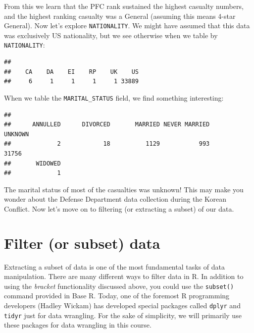 \documentclass[]{book}
\newenvironment{Shaded}{\begin{snugshade}}{\end{snugshade}}
\newcommand{\KeywordTok}[1]{\textcolor[rgb]{0.13,0.29,0.53}{\textbf{{#1}}}}
\newcommand{\NormalTok}[1]{{#1}}
\begin{document}
From this we learn that the PFC rank sustained the highest casualty
numbers, and the highest ranking casualty was a General (assuming this
means 4-star General). Now let's explore \texttt{NATIONALITY}. We might
have assumed that this data was exclusively US nationality, but we see
otherwise when we table by \texttt{NATIONALITY}:

\begin{Shaded}
\end{Shaded}

\begin{verbatim}
## 
##    CA    DA    EI    RP    UK    US 
##     6     1     1     1     1 33889
\end{verbatim}

When we table the \texttt{MARITAL\_STATUS} field, we find something
interesting:

\begin{Shaded}
\end{Shaded}

\begin{verbatim}
## 
##      ANNULLED      DIVORCED       MARRIED NEVER MARRIED       UNKNOWN 
##             2            18          1129           993         31756 
##       WIDOWED 
##             1
\end{verbatim}

The marital status of most of the casualties was unknown! This may make
you wonder about the Defense Department data collection during the
Korean Conflict. Now let's move on to filtering (or extracting a subset)
of our data.

\section{Filter (or subset) data}\label{filter-or-subset-data}

Extracting a subset of data is one of the most fundamental tasks of data
manipulation. There are many different ways to filter data in R. In
addition to using the \emph{bracket} functionality discussed above, you
could use the \texttt{subset()} command provided in Base R. Today, one
of the foremost R programming developers (Hadley Wickam) has developed
special packages called \texttt{dplyr} \citep{R-dplyr} and
\texttt{tidyr} \citep{R-tidyr} just for data wrangling. For the sake of
simplicity, we will primarily use these packages for data wrangling in
this course.
\end{document}
